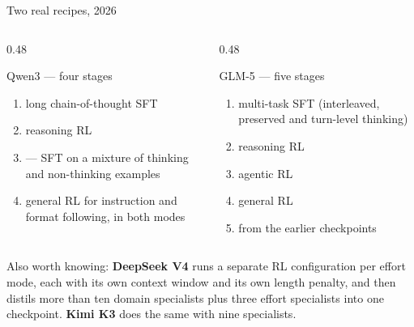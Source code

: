 \documentclass[aspectratio=169,10pt]{beamer}
\begin{document}
\begin{frame}[shrink=11]{Two real recipes, 2026}
  \begin{columns}[T]
    \begin{column}{0.48\textwidth}
      \begin{block}{Qwen3 --- four stages}
        \small
        \begin{enumerate}
          \item long chain-of-thought SFT
          \item reasoning RL
          \item {} --- SFT on a mixture of thinking
            and non-thinking examples
          \item general RL for instruction and format following, in both modes
        \end{enumerate}
      \end{block}
    \end{column}
    \begin{column}{0.48\textwidth}
      \begin{block}{GLM-5 --- five stages}
        \small
        \begin{enumerate}
          \item multi-task SFT (interleaved, preserved and turn-level thinking)
          \item reasoning RL
          \item agentic RL
          \item general RL
          \item {} from the earlier checkpoints
        \end{enumerate}
      \end{block}
    \end{column}
  \end{columns}
  \vspace{0.5em}
  \raggedright
  Also worth knowing: \textbf{DeepSeek V4} runs a separate RL configuration per
  effort mode, each with its own context window and its own length penalty, and
  then distils more than ten domain specialists plus three effort specialists
  into one checkpoint. \textbf{Kimi K3} does the same with nine specialists.
\end{frame}
\fi
\end{document}

